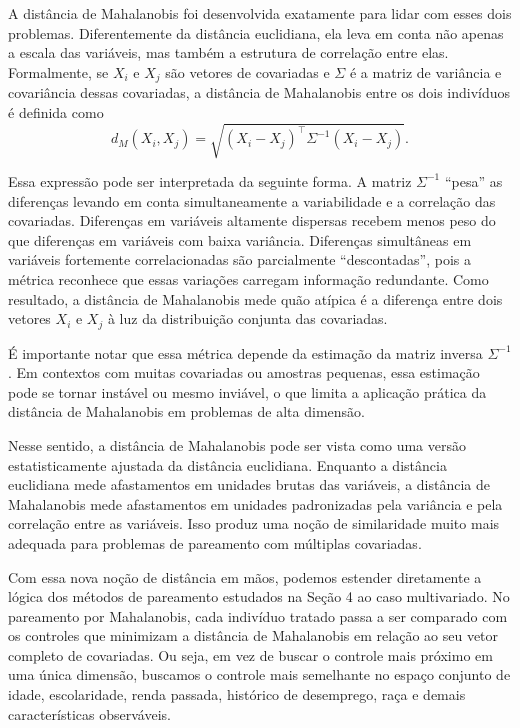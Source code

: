 A distância de Mahalanobis foi desenvolvida exatamente para lidar com esses dois problemas. Diferentemente da distância euclidiana, ela leva em conta não apenas a escala das variáveis, mas também a estrutura de correlação entre elas. Formalmente, se $X_i$ e $X_j$ são vetores de covariadas e $\Sigma$ é a matriz de variância e covariância dessas covariadas, a distância de Mahalanobis entre os dois indivíduos é definida como
\[
d_M(X_i,X_j)
=
\sqrt{(X_i - X_j)^{\top}\Sigma^{-1}(X_i - X_j)}.
\]

Essa expressão pode ser interpretada da seguinte forma. A matriz $\Sigma^{-1}$ ``pesa'' as diferenças levando em conta simultaneamente a variabilidade e a correlação das covariadas. Diferenças em variáveis altamente dispersas recebem menos peso do que diferenças em variáveis com baixa variância. Diferenças simultâneas em variáveis fortemente correlacionadas são parcialmente ``descontadas'', pois a métrica reconhece que essas variações carregam informação redundante. Como resultado, a distância de Mahalanobis mede quão atípica é a diferença entre dois vetores $X_i$ e $X_j$ à luz da distribuição conjunta das covariadas.

É importante notar que essa métrica depende da estimação da matriz inversa $\Sigma^{-1}$. Em contextos com muitas covariadas ou amostras pequenas, essa estimação pode se tornar instável ou mesmo inviável, o que limita a aplicação prática da distância de Mahalanobis em problemas de alta dimensão.


Nesse sentido, a distância de Mahalanobis pode ser vista como uma versão estatisticamente ajustada da distância euclidiana. Enquanto a distância euclidiana mede afastamentos em unidades brutas das variáveis, a distância de Mahalanobis mede afastamentos em unidades padronizadas pela variância e pela correlação entre as variáveis. Isso produz uma noção de similaridade muito mais adequada para problemas de pareamento com múltiplas covariadas.

Com essa nova noção de distância em mãos, podemos estender diretamente a lógica dos métodos de pareamento estudados na Seção 4 ao caso multivariado. No pareamento por Mahalanobis, cada indivíduo tratado passa a ser comparado com os controles que minimizam a distância de Mahalanobis em relação ao seu vetor completo de covariadas. Ou seja, em vez de buscar o controle mais próximo em uma única dimensão, buscamos o controle mais semelhante no espaço conjunto de idade, escolaridade, renda passada, histórico de desemprego, raça e demais características observáveis.

